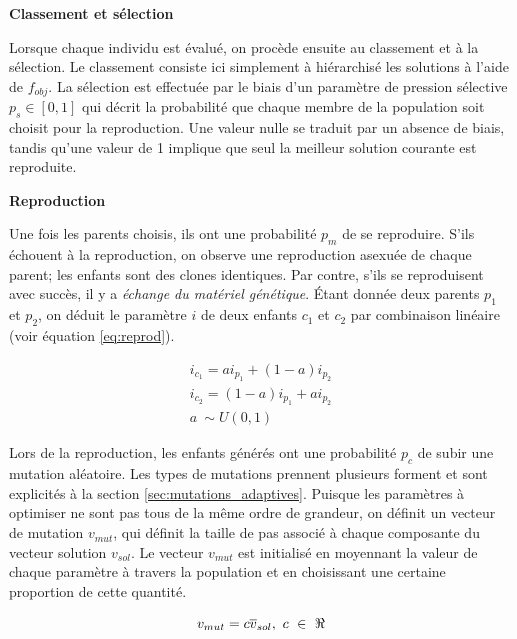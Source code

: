 \documentclass{article}
\begin{document}
\vspace{0.3cm}
\noindent\textbf{Classement et sélection}

Lorsque chaque individu est évalué, on procède ensuite au classement et à la sélection. Le classement consiste ici simplement à hiérarchisé les solutions à l'aide de $f_{obj}$. La sélection est effectuée par le biais d'un paramètre de pression sélective $p_s \in [0, 1]$ qui décrit la probabilité que chaque membre de la population soit choisit pour la reproduction.  Une valeur nulle se traduit par un absence de biais, tandis qu'une valeur de 1 implique que seul la meilleur solution courante est reproduite.

\vspace{0.3cm}
\noindent\textbf{Reproduction}

Une fois les parents choisis, ils ont une probabilité $p_m$ de se reproduire.  S'ils échouent à la reproduction, on observe une reproduction asexuée de chaque parent; les enfants sont des clones identiques. Par contre, s'ils se reproduisent avec succès, il y a \textit{échange du matériel génétique}. Étant donnée deux parents $p_1$ et $p_2$, on déduit le paramètre $i$ de deux enfants $c_1$ et $c_2$ par combinaison linéaire (voir équation \ref{eq:reprod}).

\begin{equation}\label{eq:reprod}
	\begin{gathered}
		i_{c_1} = ai_{p_1} + (1-a) i_{p_2}\\
		i_{c_2} = (1-a)i_{p_1} + a i_{p_2}\\
		a\ \sim U(0, 1)
	\end{gathered}
\end{equation}

Lors de la reproduction, les enfants générés ont une probabilité $p_c$ de subir une mutation aléatoire. Les types de mutations prennent plusieurs forment et sont explicités à la section \ref{sec:mutations_adaptives}. Puisque les paramètres à optimiser ne sont pas tous de la même ordre de grandeur, on définit un vecteur de mutation $v_{mut}$, qui définit la taille de pas associé à chaque composante du vecteur solution $v_{sol}$. Le vecteur $v_{mut}$ est initialisé en moyennant la valeur de chaque paramètre à travers la population et en choisissant une certaine proportion de cette quantité.


\begin{equation}\label{mutation_ini}
	v_{mut} = c \overline{v}_{sol},\ c\ \in\ \real
\end{equation}
\end{document}
